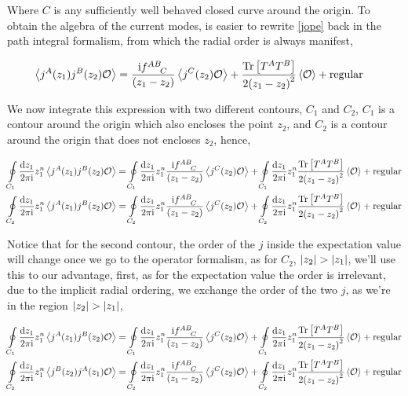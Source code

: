Where $C$ is any sufficiently well behaved closed curve around the origin. To obtain the algebra of the current modes, 
is easier to rewrite \ref{jope} back in the path integral formalism, from which the radial order is always manifest,

\begin{align*}
    \expval{j^A\qty(z_1)j ^B\qty(z_2)\mathcal O}&=\frac{\im\tensor{f}{^A^B_C}}{\qty(z_1-z_2)}\expval{j^C\qty(z_2)\mathcal O}+\frac{\Tr\qty[T^A T^B]}{2\qty(z_1-z_2)^2}\expval{\mathcal O}+\textnormal{regular}
\end{align*}

We now integrate this expression with two different contours, $C_1$ and $C_2$, $C_1$ is a contour around the origin which also 
encloses the point $z_2$, and $C_2$ is a contour around the origin that does not encloses $z_2$, hence,

\begin{align*}
    \oint\limits_{C_1}\frac{\dd{{z_1}}}{2\pi\im}z_1^n\expval{j^A\qty(z_1)j ^B\qty(z_2)\mathcal O}&=\oint\limits_{C_1}\frac{\dd{{z_1}}}{2\pi\im}z_1^n\frac{\im\tensor{f}{^A^B_C}}{\qty(z_1-z_2)}\expval{j^C\qty(z_2)\mathcal O}+\oint\limits_{C_1}\frac{\dd{{z_1}}}{2\pi\im}z_1^n\frac{\Tr\qty[T^A T^B]}{2\qty(z_1-z_2)^2}\expval{\mathcal O}+\textnormal{regular}\\
    \oint\limits_{C_2}\frac{\dd{{z_1}}}{2\pi\im}z_1^n\expval{j^A\qty(z_1)j ^B\qty(z_2)\mathcal O}&=\oint\limits_{C_2}\frac{\dd{{z_1}}}{2\pi\im}z_1^n\frac{\im\tensor{f}{^A^B_C}}{\qty(z_1-z_2)}\expval{j^C\qty(z_2)\mathcal O}+\oint\limits_{C_2}\frac{\dd{{z_1}}}{2\pi\im}z_1^n\frac{\Tr\qty[T^A T^B]}{2\qty(z_1-z_2)^2}\expval{\mathcal O}+\textnormal{regular}
\end{align*}

Notice that for the second contour, the order of the $j$ inside the expectation value will change once we go to the operator formalism, as for $C_2$, $\abs{z_2}>\abs{z_1}$, 
we'll use this to our advantage, first, as for the expectation value the order is irrelevant, due to the implicit radial ordering, we exchange the order of the two $j$, as we're 
in the region $\abs{z_2}>\abs{z_1}$,

\begin{align*}
    \oint\limits_{C_1}\frac{\dd{{z_1}}}{2\pi\im}z_1^n\expval{j^A\qty(z_1)j ^B\qty(z_2)\mathcal O}&=\oint\limits_{C_1}\frac{\dd{{z_1}}}{2\pi\im}z_1^n\frac{\im\tensor{f}{^A^B_C}}{\qty(z_1-z_2)}\expval{j^C\qty(z_2)\mathcal O}+\oint\limits_{C_1}\frac{\dd{{z_1}}}{2\pi\im}z_1^n\frac{\Tr\qty[T^A T^B]}{2\qty(z_1-z_2)^2}\expval{\mathcal O}+\textnormal{regular}\\
    \oint\limits_{C_2}\frac{\dd{{z_1}}}{2\pi\im}z_1^n\expval{j ^B\qty(z_2)j^A\qty(z_1)\mathcal O}&=\oint\limits_{C_2}\frac{\dd{{z_1}}}{2\pi\im}z_1^n\frac{\im\tensor{f}{^A^B_C}}{\qty(z_1-z_2)}\expval{j^C\qty(z_2)\mathcal O}+\oint\limits_{C_2}\frac{\dd{{z_1}}}{2\pi\im}z_1^n\frac{\Tr\qty[T^A T^B]}{2\qty(z_1-z_2)^2}\expval{\mathcal O}+\textnormal{regular}
\end{align*}

